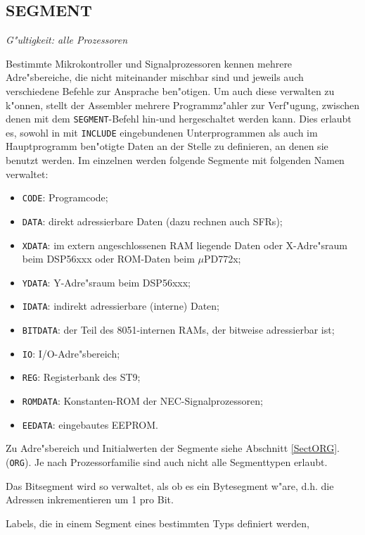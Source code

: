\documentclass[12pt,a4paper,twoside]{report}
\makeatletter
\newcommand{\tty}[1]{{\tt #1}}
\newcommand{\ttindex}[1]{\index{#1@{\tt #1}}}
\makeatother
\begin{document}

\subsection{SEGMENT}
\ttindex{SEGMENT}
\label{SEGMENT}

{\em G"ultigkeit: alle Prozessoren}

Bestimmte Mikrokontroller und Signalprozessoren kennen mehrere
Adre"sbereiche, die nicht miteinander mischbar sind und jeweils auch
verschiedene Befehle zur Ansprache ben"otigen.  Um auch diese verwalten zu
k"onnen, stellt der Assembler mehrere Programmz"ahler zur Verf"ugung,
zwischen denen mit dem
\tty{SEGMENT}-Befehl hin-und hergeschaltet werden kann.  Dies erlaubt es,
sowohl in mit \tty{INCLUDE} eingebundenen Unterprogrammen als auch im
Hauptprogramm ben"otigte Daten an der Stelle zu definieren, an denen
sie benutzt werden.  Im einzelnen werden folgende Segmente mit folgenden
Namen verwaltet:
\begin{itemize}
\item{\tty{CODE}: Programcode;}
\item{\tty{DATA}: direkt adressierbare Daten (dazu rechnen auch SFRs);}
\item{\tty{XDATA}: im extern angeschlossenen RAM liegende Daten oder
             X-Adre"sraum beim DSP56xxx oder ROM-Daten beim $\mu$PD772x;}
\item{\tty{YDATA}: Y-Adre"sraum beim DSP56xxx;}
\item{\tty{IDATA}: indirekt adressierbare (interne) Daten;}
\item{\tty{BITDATA}: der Teil des 8051-internen RAMs, der bitweise
      adressierbar ist;}
\item{\tty{IO}: I/O-Adre"sbereich;}
\item{\tty{REG}: Registerbank des ST9;}
\item{\tty{ROMDATA}: Konstanten-ROM der NEC-Signalprozessoren;}
\item{\tty{EEDATA}: eingebautes EEPROM.}
\end{itemize}
Zu Adre"sbereich und Initialwerten der Segmente siehe Abschnitt \ref{SectORG}.
(\tty{ORG}).  Je nach Prozessorfamilie sind auch nicht alle Segmenttypen
erlaubt.
\par
Das Bitsegment wird so verwaltet, als ob es ein Bytesegment w"are,
d.h. die Adressen inkrementieren um 1 pro Bit.
\par
Labels, die in einem Segment eines bestimmten Typs definiert werden,
\end{document}
